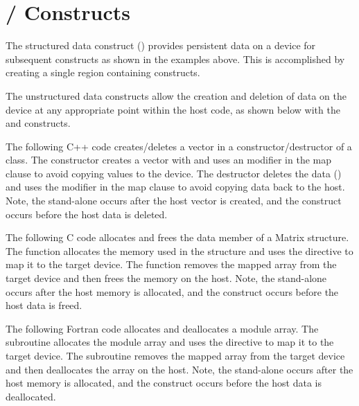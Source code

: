 \pagebreak
\section{ /  Constructs}
\label{sec:target_enter_exit_data}

The structured data construct () provides persistent data on a
device for subsequent  constructs as shown in the 
 examples above. This is accomplished by creating a single
 region containing  constructs.

The unstructured data constructs allow the creation and deletion of data on
the device at any appropriate point within the host code, as shown below 
with the  and  constructs.

The following C++ code creates/deletes a vector in a constructor/destructor 
of a class. The constructor creates a vector with 
and uses an  modifier in the map clause to avoid copying values
to the device. The destructor deletes the data ()
and uses the  modifier in the map clause to avoid copying data
back to the host. Note, the stand-alone  occurs 
after the host vector is created, and the 
construct occurs before the host data is deleted.

The following C code allocates and frees the data member of a Matrix structure.
The  function allocates the memory used in the structure and
uses the  directive to map it to the target device. The
 function removes the mapped array from the target device
and then frees the memory on the host.  Note, the stand-alone  occurs after the host memory is allocated, and the  construct occurs before the host data is freed.

The following Fortran code allocates and deallocates a module array.  The
 subroutine allocates the module array and uses the
 directive to map it to the target device. The
 subroutine removes the mapped array from the target device and
then deallocates the array on the host.  Note, the stand-alone  occurs after the host memory is allocated, and the  construct occurs before the host data is deallocated.

